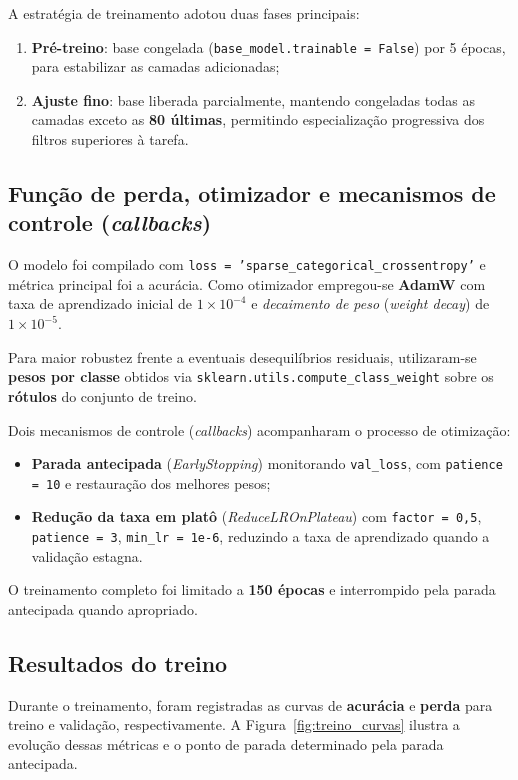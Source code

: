 \documentclass[repeatfields,xlists,xpacks,oneside]{ufrgscca}
\begin{document}
A estratégia de treinamento adotou duas fases principais:
\begin{enumerate}
    \item \textbf{Pré-treino}: base congelada (\texttt{base\_model.trainable = False}) por 5 épocas, para estabilizar as camadas adicionadas;
    \item \textbf{Ajuste fino}: base liberada parcialmente, mantendo congeladas todas as camadas exceto as \textbf{80 últimas}, permitindo especialização progressiva dos filtros superiores à tarefa.
\end{enumerate}

\subsection{Função de perda, otimizador e mecanismos de controle (\textit{callbacks})}
O modelo foi compilado com \texttt{loss = 'sparse\_categorical\_crossentropy'} e métrica principal foi a acurácia. Como otimizador empregou-se \textbf{AdamW} com taxa de aprendizado inicial de \(1\times 10^{-4}\) e \textit{decaimento de peso} (\textit{weight decay}) de \(1\times 10^{-5}\).

Para maior robustez frente a eventuais desequilíbrios residuais, utilizaram-se \textbf{pesos por classe} obtidos via \texttt{sklearn.utils.compute\_class\_weight} sobre os \textbf{rótulos} do conjunto de treino.

Dois mecanismos de controle (\textit{callbacks}) acompanharam o processo de otimização:
\begin{itemize}
    \item \textbf{Parada antecipada} (\textit{EarlyStopping}) monitorando \texttt{val\_loss}, com \texttt{patience = 10} e restauração dos melhores pesos;
    \item \textbf{Redução da taxa em platô} (\textit{ReduceLROnPlateau}) com \texttt{factor = 0{,}5}, \texttt{patience = 3}, \texttt{min\_lr = 1e-6}, reduzindo a taxa de aprendizado quando a validação estagna.
\end{itemize}

O treinamento completo foi limitado a \textbf{150 épocas} e interrompido pela parada antecipada quando apropriado.

\subsection{Resultados do treino}
Durante o treinamento, foram registradas as curvas de \textbf{acurácia} e \textbf{perda} para treino e validação, respectivamente. A Figura~\ref{fig:treino_curvas} ilustra a evolução dessas métricas e o ponto de parada determinado pela parada antecipada.
\end{document}
